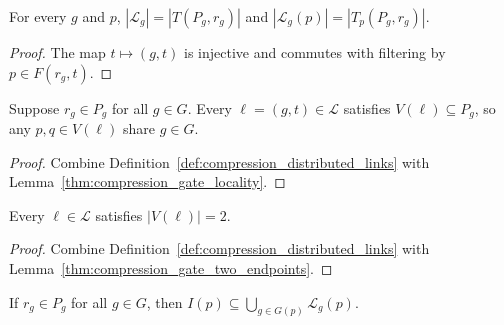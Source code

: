 \begin{lemma}
    \label{thm:compression_tagging_cardinality}
    \leanok
    For every $g$ and $p$, $|\mathcal L_g|=|T(P_g,r_g)|$ and $|\mathcal L_g(p)|=|T_p(P_g,r_g)|$.
\end{lemma}

\begin{proof}\leanok
    The map $t\mapsto(g,t)$ is injective and commutes with filtering by $p\in F(r_g,t)$.
\end{proof}

\begin{lemma}
    \label{thm:compression_original_gate_locality}
    \leanok
    Suppose $r_g\in P_g$ for all $g\in G$. Every $\ell=(g,t)\in\mathcal L$ satisfies $V(\ell)\subseteq P_g$, so any $p,q\in V(\ell)$ share $g\in G$.
\end{lemma}

\begin{proof}\leanok
    Combine Definition~\ref{def:compression_distributed_links} with Lemma~\ref{thm:compression_gate_locality}.
\end{proof}

\begin{lemma}
    \label{thm:compression_distributed_two_endpoints}
    \leanok
    Every $\ell\in\mathcal L$ satisfies $|V(\ell)|=2$.
\end{lemma}

\begin{proof}\leanok
    Combine Definition~\ref{def:compression_distributed_links} with Lemma~\ref{thm:compression_gate_two_endpoints}.
\end{proof}

\begin{lemma}
    \label{thm:compression_incidence_containment}
    \leanok
    If $r_g\in P_g$ for all $g\in G$, then $I(p)\subseteq\bigcup_{g\in G(p)}\mathcal L_g(p)$.
\end{lemma}

